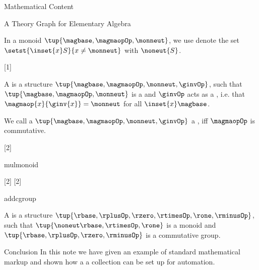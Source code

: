 \documentclass{omdoc}
\begin{document}
\begin{omgroup}[id=sec.math]{Mathematical Content}
\begin{omgroup}[id=sec.math]{A Theory Graph for Elementary Algebra}
\begin{module}[id=monoid]
 \begin{definition}[id=noneut.def]
   In a monoid $\tup{\magbase,\magmaopOp,\monneut}$, we use denote the set
   $\setst{\inset{x}S}{x\ne\monneut}$ with $\noneut{S}$.
 \end{definition}
\end{module}

\begin{module}[id=group]
  [1]{\prefix{}}
  \begin{definition}[id=group.def]
    A  is a structure $\tup{\magbase,\magmaopOp,\monneut,\ginvOp}$, such that
    $\tup{\magbase,\magmaopOp,\monneut}$ is a  and $\ginvOp$ acts as
    a , i.e. that $\magmaop{x}{\ginv{x}}=\monneut$ for all
    $\inset{x}\magbase$.
  \end{definition}
\end{module}

\begin{module}[id=cgroup]
\begin{definition}[id=cgroup.def]
  We call a  $\tup{\magbase,\magmaopOp,\monneut,\ginvOp}$ a
  , iff $\magmaopOp$ is commutative.
\end{definition}
\end{module}

\begin{module}[id=ring]
[2]{\infix{}}
\begin{sstructure}{mul}{monoid}
\end{sstructure}
[2]{\infix{}}
[2]{\infix{}}
\begin{sstructure}{add}{cgroup}
\end{sstructure}

\begin{definition}
  A  is a structure $\tup{\rbase,\rplusOp,\rzero,\rtimesOp,\rone,\rminusOp}$,
  such that $\tup{\noneut\rbase,\rtimesOp,\rone}$ is a monoid and
  $\tup{\rbase,\rplusOp,\rzero,\rminusOp}$ is a commutative group.
\end{definition}
\end{module}
\end{omgroup}
\end{omgroup}

\begin{omgroup}[id=concl]{Conclusion}
  In this note we have given an example of standard mathematical markup and shown how a a
  {\sTeX} collection can be set up for automation.
\end{omgroup}
\printbibliography
\end{document}
